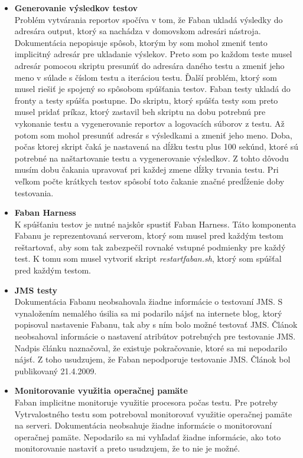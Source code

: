 \documentclass[12pt,oneside,final]{fithesis-utf8}
\newcommand\underscore[1]{\underline{\hspace{8pt}}}
\begin{document}
\begin{itemize}

\item \textbf{Generovanie výsledkov testov}\\
Problém vytvárania reportov spočíva v tom, že Faban ukladá výsledky do adresára output, ktorý sa nachádza v domovskom adresári nástroja. Dokumentácia nepopisuje spôsob, ktorým by som mohol zmeniť tento implicitný adresár pre ukladanie výslekov. Preto som po každom teste musel adresár pomocou skriptu presunúť do adresára daného testu a zmeniť jeho meno v súlade s číslom testu a iteráciou testu. Ďalší problém, ktorý som musel riešiť je spojený so spôsobom spúšťania testov. Faban testy ukladá do fronty a testy spúšťa postupne. Do skriptu, ktorý spúšťa testy som preto musel pridať príkaz, ktorý zastavil beh skriptu na dobu potrebnú pre vykonanie testu a vygenerovanie reportov a logovacích súborov z testu. Až potom som mohol presunúť adresár s výsledkami a zmeniť jeho meno. Doba, počas ktorej skript čaká je nastavená na dĺžku testu plus 100 sekúnd, ktoré sú potrebné na naštartovanie testu a vygenerovanie výsledkov. Z tohto dôvodu musím dobu čakania upravovať pri každej zmene dĺžky trvania testu. Pri veľkom počte krátkych testov spôsobí toto čakanie značné predĺženie doby testovania.

\item \textbf{Faban Harness}\\
K spúšťaniu testov je nutné najskôr spustiť Faban Harness. Táto komponenta Fabanu je reprezentovaná serverom, ktorý som musel pred každým testom reštartovať, aby som tak zabezpečil rovnaké vstupné podmienky pre každý test. K tomu som musel vytvoriť skript \textit{restart\underscore{}faban.sh}, ktorý som spúšťal pred každým testom.\\

\item \textbf{JMS testy}\\
Dokumentácia Fabanu neobsahovala žiadne informácie o testovaní JMS. S vynaložením nemalého úsilia sa mi podarilo nájsť na internete blog, ktorý popisoval nastavenie Fabanu, tak aby s ním bolo možné testovať JMS. Článok neobsahoval informácie o nastavení atribútov potrebných pre testovanie JMS. Nadpis článku naznačoval, že existuje pokračovanie, ktoré sa mi nepodarilo nájsť. Z toho usudzujem, že Faban nepodporuje testovanie JMS. Článok bol publikovaný 21.4.2009\cite{FabanBlog}.

\item \textbf{Monitorovanie využitia operačnej pamäte}\\
Faban implicitne monitoruje využitie procesora počas testu. Pre potreby Vytrvalostného testu som potreboval monitorovať využitie operačnej pamäte na serveri. Dokumentácia neobsahuje žiadne informácie o monitorovaní operačnej pamäte. Nepodarilo sa mi vyhľadať žiadne informácie, ako toto monitorovanie nastaviť a preto usudzujem, že to nie je možné.\\

\end{itemize}
\end{document}
